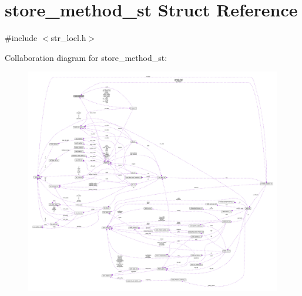 \hypertarget{structstore__method__st}{}\section{store\+\_\+method\+\_\+st Struct Reference}
\label{structstore__method__st}


{\ttfamily \#include $<$str\+\_\+locl.\+h$>$}



Collaboration diagram for store\+\_\+method\+\_\+st\+:\nopagebreak
\begin{figure}[H]
\begin{center}
\leavevmode
\includegraphics[width=350pt]{structstore__method__st__coll__graph}
\end{center}
\end{figure}
